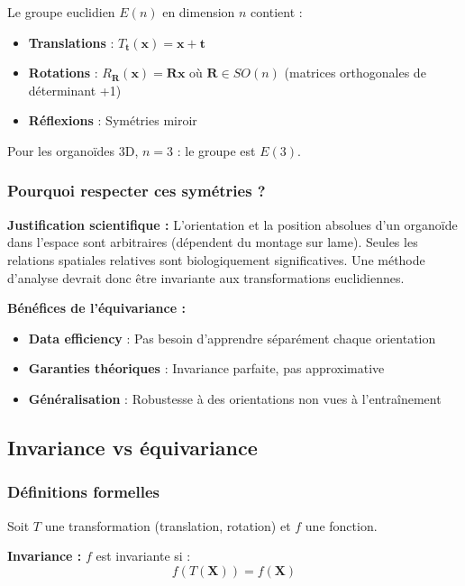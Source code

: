 Le groupe euclidien $E(n)$ en dimension $n$ contient :
\begin{itemize}
    \item \textbf{Translations} : $T_{\mathbf{t}}(\mathbf{x}) = \mathbf{x} + \mathbf{t}$
    \item \textbf{Rotations} : $R_{\mathbf{R}}(\mathbf{x}) = \mathbf{R}\mathbf{x}$ où $\mathbf{R} \in SO(n)$ (matrices orthogonales de déterminant +1)
    \item \textbf{Réflexions} : Symétries miroir
\end{itemize}

Pour les organoïdes 3D, $n = 3$ : le groupe est $E(3)$.

\subsubsection{Pourquoi respecter ces symétries ?}

\textbf{Justification scientifique :}
L'orientation et la position absolues d'un organoïde dans l'espace sont arbitraires (dépendent du montage sur lame). Seules les relations spatiales relatives sont biologiquement significatives. Une méthode d'analyse devrait donc être invariante aux transformations euclidiennes.

\textbf{Bénéfices de l'équivariance :}
\begin{itemize}
    \item \textbf{Data efficiency} : Pas besoin d'apprendre séparément chaque orientation
    \item \textbf{Garanties théoriques} : Invariance parfaite, pas approximative
    \item \textbf{Généralisation} : Robustesse à des orientations non vues à l'entraînement
\end{itemize}

\subsection{Invariance vs équivariance}

\subsubsection{Définitions formelles}

Soit $T$ une transformation (translation, rotation) et $f$ une fonction.

\textbf{Invariance :}
$f$ est invariante si :
\[
f(T(\mathbf{X})) = f(\mathbf{X})
\]

